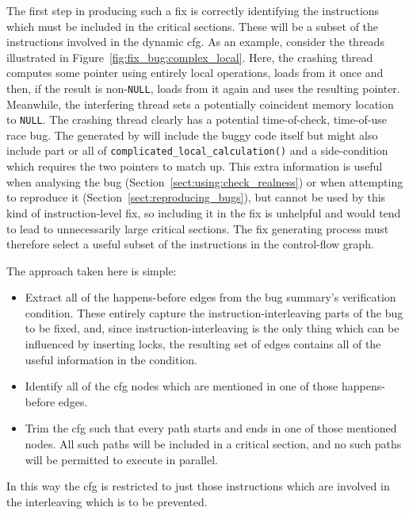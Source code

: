 The first step in producing such a fix is correctly identifying the
instructions which must be included in the critical sections.  These
will be a subset of the instructions involved in the dynamic
\gls{cfg}.  As an example, consider the threads illustrated in
Figure~\ref{fig:fix_bug:complex_local}.  Here, the crashing thread
computes some pointer using entirely local operations, loads from it
once and then, if the result is non-\texttt{NULL}, loads from it again
and uses the resulting pointer.  Meanwhile, the interfering thread
sets a potentially coincident memory location to \texttt{NULL}.  The
crashing thread clearly has a potential time-of-check, time-of-use
race bug.  The {\StateMachines} generated by {\technique} will include
the buggy code itself but might also include part or all of
\texttt{complicated\_local\_calculation()} and a side-condition which
requires the two pointers to match up.  This extra information is
useful when analysing the bug
(Section~\ref{sect:using:check_realness}) or when attempting to
reproduce it (Section~\ref{sect:reproducing_bugs}), but cannot be used
by this kind of instruction-level fix, so including it in the fix is
unhelpful and would tend to lead to unnecessarily large critical
sections.  The fix generating process must therefore select a useful
subset of the instructions in the control-flow graph.

The approach taken here is simple:

\begin{itemize}
\item
  Extract all of the happens-before edges from the bug summary's
  verification condition.  These entirely capture the
  instruction-interleaving parts of the bug to be fixed, and, since
  instruction-interleaving is the only thing which can be influenced
  by inserting locks, the resulting set of edges contains all of the
  useful information in the condition.
\item
  Identify all of the \gls{cfg} nodes which are mentioned in one of those
  happens-before edges.
\item
  Trim the \gls{cfg} such that every path starts and ends in one of those
  mentioned nodes.  All such paths will be included in a critical
  section, and no such paths will be permitted to execute in parallel.
\end{itemize}

In this way the \gls{cfg} is restricted to just those instructions which are
involved in the interleaving which is to be prevented.

